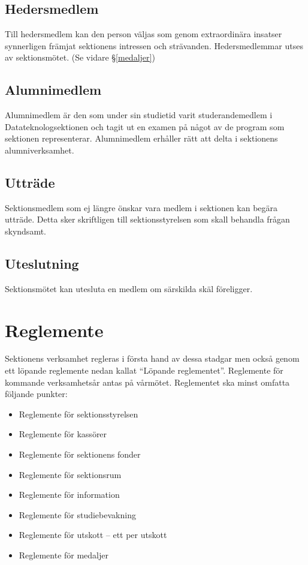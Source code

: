 \documentclass{datateknologsektionen-document}
\begin{document}
    \subsection{Hedersmedlem}
      Till hedersmedlem kan den person väljas som genom extraordinära insatser synnerligen
      främjat sektionens intressen och strävanden. Hedersmedlemmar utses av
      sektionsmötet. (Se vidare \S \ref{medaljer})

    \subsection{Alumnimedlem}
      Alumnimedlem är den som under sin studietid varit studerandemedlem i
      Datateknologsektionen och tagit ut en examen på något av de program som sektionen
      representerar. Alumnimedlem erhåller rätt att delta i sektionens alumniverksamhet.
    \subsection{Utträde}
      Sektionsmedlem som ej längre önskar vara medlem i sektionen kan begära utträde.
      Detta sker skriftligen till sektionsstyrelsen som skall behandla frågan skyndsamt.
    \subsection{Uteslutning}
      Sektionsmötet kan utesluta en medlem om särskilda skäl föreligger.
  \section{Reglemente}
    Sektionens verksamhet regleras i första hand av dessa stadgar men också genom ett
    löpande reglemente nedan kallat ``Löpande reglementet''. Reglemente för kommande
    verksamhetsår antas på vårmötet. Reglementet ska minst omfatta följande punkter:
    \begin{itemize}
      \item Reglemente för sektionsstyrelsen
      \item Reglemente för kassörer
      \item Reglemente för sektionens fonder
      \item Reglemente för sektionsrum
      \item Reglemente för information
      \item Reglemente för studiebevakning
      \item Reglemente för utskott – ett per utskott
      \item Reglemente för medaljer
    \end{itemize}
     
\end{document}
